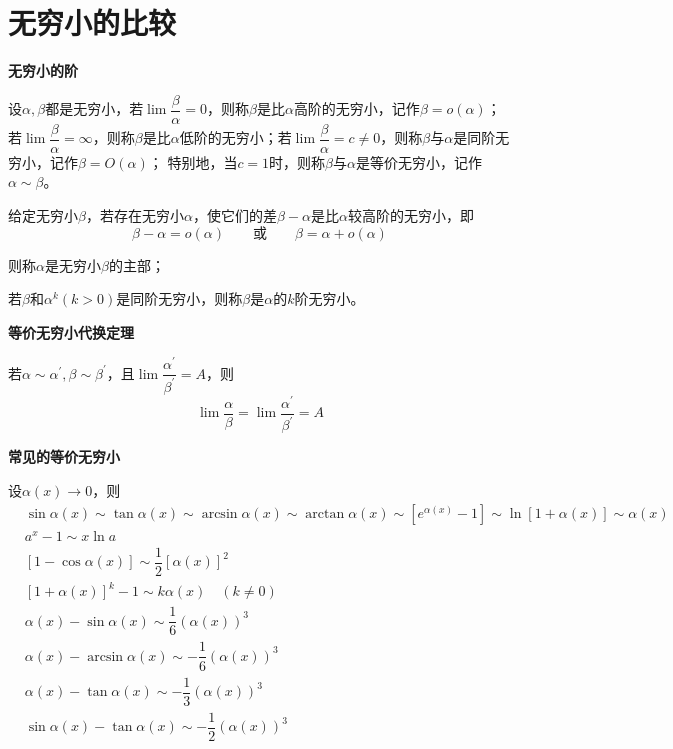 
\section{无穷小的比较}
\textbf{无穷小的阶}

设$\alpha,\beta$都是无穷小，若$\lim\dfrac{\beta}{\alpha}=0$，则称$\beta$是比$\alpha$高阶的无穷小，记作$\beta = o(\alpha)$；若$\lim\dfrac{\beta}{\alpha}=\infty$，则称$\beta$是比$\alpha$低阶的无穷小；若$\lim\dfrac{\beta}{\alpha}=c\neq 0$，则称$\beta$与$\alpha$是同阶无穷小，记作$\beta = O(\alpha)$；
特别地，当$c=1$时，则称$\beta$与$\alpha$是等价无穷小，记作$\alpha\sim\beta$。

给定无穷小$\beta$，若存在无穷小$\alpha$，使它们的差$\beta-\alpha$是比$\alpha$较高阶的无穷小，即
\begin{equation}
    \beta-\alpha = o(\alpha) \qquad \mbox{或} \qquad \beta = \alpha+o(\alpha)\nonumber
\end{equation}

则称$\alpha$是无穷小$\beta$的主部；

若$\beta$和$\alpha^k(k>0)$是同阶无穷小，则称$\beta$是$\alpha$的$k$阶无穷小。

\textbf{等价无穷小代换定理}

若$\alpha\sim\alpha^{'},\beta\sim\beta^{'}$，且$\lim\dfrac{\alpha^{'}}{\beta^{'}}=A$，则
\begin{equation}
    \lim\dfrac{\alpha}{\beta} = \lim\dfrac{\alpha^{'}}{\beta^{'}} = A \nonumber
\end{equation}

\textbf{常见的等价无穷小}

设$\alpha(x)\rightarrow 0$，则
\begin{equation}
    \begin{aligned}
        & \sin\alpha(x) \sim \tan\alpha(x) \sim \arcsin\alpha(x) \sim \arctan\alpha(x) \sim [e^{\alpha(x)}-1] \sim \ln[1+\alpha(x)] \sim \alpha(x) \\
        & a^x - 1 \sim x\ln a \\
        & [1-\cos\alpha(x)] \sim \dfrac{1}{2}[\alpha(x)]^2 \\
        & [1+\alpha(x)]^k - 1 \sim k\alpha(x) \quad (k\neq 0) \\
        & \alpha(x) - \sin\alpha(x) \sim \dfrac{1}{6} (\alpha(x))^3 \\
        & \alpha(x) - \arcsin\alpha(x) \sim -\dfrac{1}{6} (\alpha(x))^3 \\
        & \alpha(x) - \tan\alpha(x) \sim -\dfrac{1}{3} (\alpha(x))^3 \\ 
        & \sin\alpha(x) - \tan\alpha(x) \sim -\dfrac{1}{2} (\alpha(x))^3
    \end{aligned} \nonumber
\end{equation}

